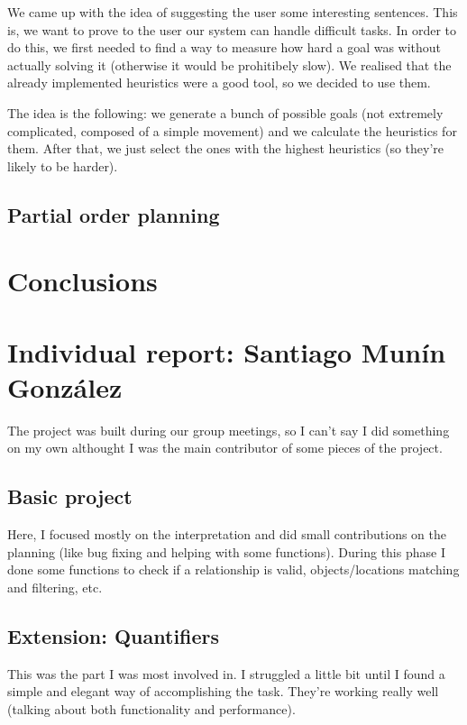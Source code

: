 \documentclass[11pt]{article}
\begin{document}
        We came up with the idea of suggesting the user some interesting sentences. This is, we want 
        to prove to the user our system can handle difficult tasks. In order to do this, we first needed 
        to find a way to measure how hard a goal was without actually solving it (otherwise it would be 
        prohitibely slow). We realised that the already implemented heuristics were a good tool, so we decided 
        to use them.

        The idea is the following: we generate a bunch of possible goals (not extremely complicated, composed 
        of a simple movement) and we calculate the heuristics for them. After that, we just select the ones with 
        the highest heuristics (so they're likely to be harder).
	\subsection{Partial order planning}

	\section{Conclusions}

\newpage
\appendix
\section{Individual report: Santiago Munín González}
The project was built during our group meetings, so I can't say I did something on my own althought I 
was the main contributor of some pieces of the project.

\subsection{Basic project}

Here, I focused mostly on the interpretation and did small contributions on the planning (like bug fixing and 
helping with some functions). During this phase I done some functions to check if a relationship is valid, 
objects/locations matching and filtering, etc.

\subsection{Extension: Quantifiers}

This was the part I was most involved in. I struggled a little 
bit until I found a simple and elegant way of accomplishing the task. They're working really well (talking about both functionality and performance).
\end{document}
